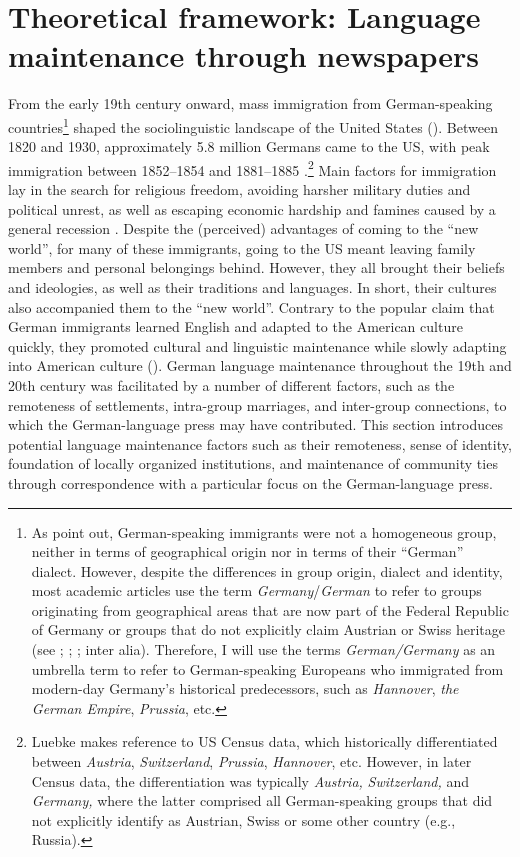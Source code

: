 \documentclass[output=paper]{langsci/langscibook}
\begin{document}
\section{Theoretical framework: Language maintenance through newspapers} %
\label{sec:rocker:2}

From the early 19th century onward, mass immigration from German-speaking countries\footnote{As \citet[29]{PutnamSalmons2015} point out, German-speaking immigrants were not a homogeneous group, neither in terms of geographical origin nor in terms of their “German” dialect. However, despite the differences in group origin, dialect and identity, most academic articles use the term \textit{Germany}/\textit{German} to refer to groups originating from geographical areas that are now part of the Federal Republic of Germany or groups that do not explicitly claim Austrian or Swiss heritage (see \citealt{Schwartzkopff1987}; \citealt{Boas2002}; \citealt{PutnamSalmons2015}; inter alia). Therefore, I will use the terms \textit{German/Germany} as an umbrella term to refer to German-speaking Europeans who immigrated from modern-day Germany’s historical predecessors, such as \textit{Hannover}, \textit{the German Empire}, \textit{Prussia}, etc. } shaped the sociolinguistic landscape of the United States (\citealt{PutnamSalmons2015}). Between 1820 and 1930, approximately 5.8 million Germans came to the US, with peak immigration between 1852--1854 and 1881--1885 \citep[95]{Luebke1990}.\footnote{Luebke makes reference to US Census data, which historically differentiated between \textit{Austria}, \textit{Switzerland}, \textit{Prussia}, \textit{Hannover}, etc. However, in later Census data, the differentiation was typically \textit{Austria,} \textit{Switzerland,} and \textit{Germany,} where the latter comprised all German-speaking groups that did not explicitly identify as Austrian, Swiss or some other country (e.g., Russia).} Main factors for immigration lay in the search for religious freedom, avoiding harsher military duties and political unrest, as well as escaping economic hardship and famines caused by a general recession \citep[37]{Jacob2002}. Despite the (perceived) advantages of coming to the “new world”, for many of these immigrants, going to the US meant leaving family members and personal belongings behind. However, they all brought their beliefs and ideologies, as well as their traditions and languages. In short, their cultures also accompanied them to the “new world”. Contrary to the popular claim that German immigrants learned English and adapted to the American culture quickly, they promoted cultural and linguistic maintenance while slowly adapting into American culture (\citealt{WilkersonSalmons2008}). German language maintenance throughout the 19th and 20th century was facilitated by a number of different factors, such as the remoteness of settlements, intra-group marriages, and inter-group connections, to which the German-language press may have contributed. This section introduces potential language maintenance factors such as their remoteness, sense of identity, foundation of locally organized institutions, and maintenance of community ties through correspondence with a particular focus on the German-language press. 
\end{document}
